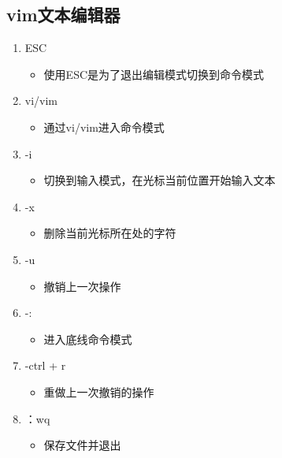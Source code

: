 \documentclass[a4paper, 12pt]{article}
\begin{document}
\subsection{vim文本编辑器}
\begin{enumerate}
\item{\large ESC}
  \begin{itemize}
    \item 使用ESC是为了退出编辑模式切换到命令模式
  \end{itemize}
\item{\large vi/vim}
    \begin{itemize}
      \item 通过vi/vim进入命令模式
    \end{itemize}
\item{\large -i}
    \begin{itemize}
      \item 切换到输入模式，在光标当前位置开始输入文本
    \end{itemize}
\item {\large -x}
    \begin{itemize}
        \item 删除当前光标所在处的字符
    \end{itemize}
\item {\large -u}
    \begin{itemize}
        \item 撤销上一次操作
    \end{itemize}
\item {\large -:}
    \begin{itemize}
        \item 进入底线命令模式
    \end{itemize}
\item {\large -ctrl + r}
    \begin{itemize}
        \item 重做上一次撤销的操作
    \end{itemize}
\item {\large ：wq}
    \begin{itemize}
        \item 保存文件并退出
    \end{itemize}
\end{enumerate}
\end{document}
